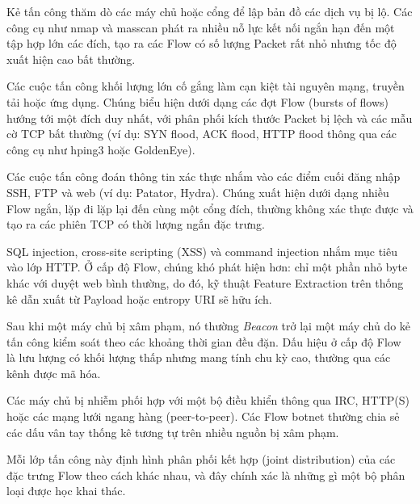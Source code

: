 \begin{description}[leftmargin=1.2em,itemsep=2pt,topsep=2pt]
    \item[Port Scan / Network Scan.] Kẻ tấn công thăm dò các máy chủ hoặc cổng để lập bản đồ các dịch vụ bị lộ. Các công cụ như \textsf{nmap} và \textsf{masscan} phát ra nhiều nỗ lực kết nối ngắn hạn đến một tập hợp lớn các đích, tạo ra các Flow có số lượng Packet rất nhỏ nhưng tốc độ xuất hiện cao bất thường.
    \item[DoS/DDoS.] Các cuộc tấn công khối lượng lớn cố gắng làm cạn kiệt tài nguyên mạng, truyền tải hoặc ứng dụng. Chúng biểu hiện dưới dạng các đợt Flow (bursts of flows) hướng tới một đích duy nhất, với phân phối kích thước Packet bị lệch và các mẫu cờ TCP bất thường (ví dụ: SYN flood, ACK flood, HTTP flood thông qua các công cụ như \textsf{hping3} hoặc \textsf{GoldenEye}).
    \item[Brute-Force.] Các cuộc tấn công đoán thông tin xác thực nhắm vào các điểm cuối đăng nhập SSH, FTP và web (ví dụ: \textsf{Patator}, \textsf{Hydra}). Chúng xuất hiện dưới dạng nhiều Flow ngắn, lặp đi lặp lại đến cùng một cổng đích, thường không xác thực được và tạo ra các phiên TCP có thời lượng ngắn đặc trưng.
    \item[Web Attacks.] SQL injection, cross-site scripting (XSS) và command injection nhắm mục tiêu vào lớp HTTP. Ở cấp độ Flow, chúng khó phát hiện hơn: chỉ một phần nhỏ byte khác với duyệt web bình thường, do đó, kỹ thuật Feature Extraction trên thống kê dẫn xuất từ Payload hoặc entropy URI sẽ hữu ích.
    \item[Xâm nhập và Beacon ra lệnh và điều khiển của Malware (C2).] Sau khi một máy chủ bị xâm phạm, nó thường \emph{Beacon} trở lại một máy chủ do kẻ tấn công kiểm soát theo các khoảng thời gian đều đặn. Dấu hiệu ở cấp độ Flow là lưu lượng có khối lượng thấp nhưng mang tính chu kỳ cao, thường qua các kênh được mã hóa.
    \item[Lưu lượng Botnet.] Các máy chủ bị nhiễm phối hợp với một bộ điều khiển thông qua IRC, HTTP(S) hoặc các mạng lưới ngang hàng (peer-to-peer). Các Flow botnet thường chia sẻ các dấu vân tay thống kê tương tự trên nhiều nguồn bị xâm phạm.
\end{description}

Mỗi lớp tấn công này định hình phân phối kết hợp (joint distribution) của các đặc trưng Flow theo cách khác nhau, và đây chính xác là những gì một bộ phân loại được học khai thác.

